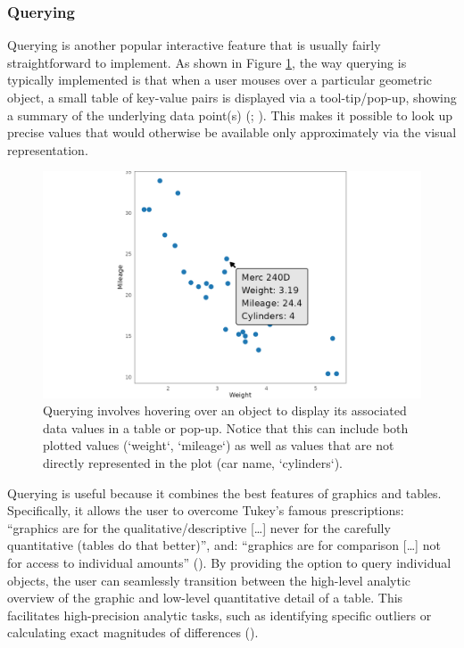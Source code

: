 \documentclass[
]{book}
\begin{document}
\subsubsection{Querying}\label{querying}

Querying is another popular interactive feature that is usually fairly straightforward to implement. As shown in Figure \ref{fig:querying}, the way querying is typically implemented is that when a user mouses over a particular geometric object, a small table of key-value pairs is displayed via a tool-tip/pop-up, showing a summary of the underlying data point(s) (; ). This makes it possible to look up precise values that would otherwise be available only approximately via the visual representation.

\begin{figure}

{\centering \includegraphics[width=20.83in]{./figures/querying} 

}

\caption{Querying involves hovering over an object to display its associated data values in a table or pop-up. Notice that this can include both plotted values (`weight`, `mileage`) as well as values that are not directly represented in the plot (car name, `cylinders`).}\label{fig:querying}
\end{figure}

Querying is useful because it combines the best features of graphics and tables. Specifically, it allows the user to overcome Tukey's famous prescriptions: ``graphics are for the qualitative/descriptive {[}\ldots{]} never for the carefully quantitative (tables do that better)'', and: ``graphics are for comparison {[}\ldots{]} not for access to individual amounts'' (). By providing the option to query individual objects, the user can seamlessly transition between the high-level analytic overview of the graphic and low-level quantitative detail of a table. This facilitates high-precision analytic tasks, such as identifying specific outliers or calculating exact magnitudes of differences ().
\end{document}
